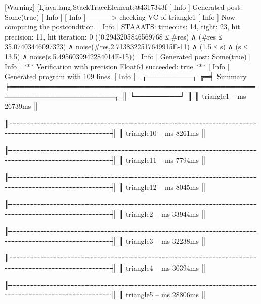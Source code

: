 [Warning] [Ljava.lang.StackTraceElement;@4317343f
[ Info  ] Generated post: Some(true)
[ Info  ] 
[ Info  ] ----------> checking VC of triangle1
[ Info  ] Now computing the postcondition.
[ Info  ] STAAATS: timeouts: 14, tight: 23, hit precision: 11, hit iteration: 0
((0.2943205846569768 ≤ #res) ∧ (#res ≤ 35.07403446097323) ∧ noise(#res,2.7138322517649915E-11) ∧ (1.5 ≤ s) ∧ (s ≤ 13.5) ∧ noise(s,5.4956039942284014E-15))
[ Info  ] Generated post: Some(true)
[ Info  ] *** Verification with precision Float64 succeeded: true ***
[ Info  ] Generated program with 109 lines.
[ Info  ] . ┌─────────┐
          ╔═╡ Summary ╞═══════════════════════════════════════════════════════════════════════╗
          ║ └─────────┘                                                                       ║
          ║ triangle1                       -- ms     26739ms                                 ║
          
          ╟┄┄┄┄┄┄┄┄┄┄┄┄┄┄┄┄┄┄┄┄┄┄┄┄┄┄┄┄┄┄┄┄┄┄┄┄┄┄┄┄┄┄┄┄┄┄┄┄┄┄┄┄┄┄┄┄┄┄┄┄┄┄┄┄┄┄┄┄┄┄┄┄┄┄┄┄┄┄┄┄┄┄┄╢
          ║ triangle10                      -- ms     8261ms                                  ║
          
          ╟┄┄┄┄┄┄┄┄┄┄┄┄┄┄┄┄┄┄┄┄┄┄┄┄┄┄┄┄┄┄┄┄┄┄┄┄┄┄┄┄┄┄┄┄┄┄┄┄┄┄┄┄┄┄┄┄┄┄┄┄┄┄┄┄┄┄┄┄┄┄┄┄┄┄┄┄┄┄┄┄┄┄┄╢
          ║ triangle11                      -- ms     7794ms                                  ║
          
          ╟┄┄┄┄┄┄┄┄┄┄┄┄┄┄┄┄┄┄┄┄┄┄┄┄┄┄┄┄┄┄┄┄┄┄┄┄┄┄┄┄┄┄┄┄┄┄┄┄┄┄┄┄┄┄┄┄┄┄┄┄┄┄┄┄┄┄┄┄┄┄┄┄┄┄┄┄┄┄┄┄┄┄┄╢
          ║ triangle12                      -- ms     8045ms                                  ║
          
          ╟┄┄┄┄┄┄┄┄┄┄┄┄┄┄┄┄┄┄┄┄┄┄┄┄┄┄┄┄┄┄┄┄┄┄┄┄┄┄┄┄┄┄┄┄┄┄┄┄┄┄┄┄┄┄┄┄┄┄┄┄┄┄┄┄┄┄┄┄┄┄┄┄┄┄┄┄┄┄┄┄┄┄┄╢
          ║ triangle2                       -- ms     33944ms                                 ║
          
          ╟┄┄┄┄┄┄┄┄┄┄┄┄┄┄┄┄┄┄┄┄┄┄┄┄┄┄┄┄┄┄┄┄┄┄┄┄┄┄┄┄┄┄┄┄┄┄┄┄┄┄┄┄┄┄┄┄┄┄┄┄┄┄┄┄┄┄┄┄┄┄┄┄┄┄┄┄┄┄┄┄┄┄┄╢
          ║ triangle3                       -- ms     32238ms                                 ║
          
          ╟┄┄┄┄┄┄┄┄┄┄┄┄┄┄┄┄┄┄┄┄┄┄┄┄┄┄┄┄┄┄┄┄┄┄┄┄┄┄┄┄┄┄┄┄┄┄┄┄┄┄┄┄┄┄┄┄┄┄┄┄┄┄┄┄┄┄┄┄┄┄┄┄┄┄┄┄┄┄┄┄┄┄┄╢
          ║ triangle4                       -- ms     30394ms                                 ║
          
          ╟┄┄┄┄┄┄┄┄┄┄┄┄┄┄┄┄┄┄┄┄┄┄┄┄┄┄┄┄┄┄┄┄┄┄┄┄┄┄┄┄┄┄┄┄┄┄┄┄┄┄┄┄┄┄┄┄┄┄┄┄┄┄┄┄┄┄┄┄┄┄┄┄┄┄┄┄┄┄┄┄┄┄┄╢
          ║ triangle5                       -- ms     28806ms                                 ║
          
